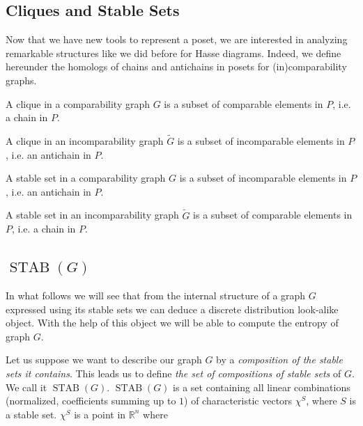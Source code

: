 \subsection{Cliques and Stable Sets}


Now that we have new tools to represent a poset, we are interested in analyzing remarkable structures like we did before for Hasse diagrams. Indeed, we define hereunder the homologs of chains and antichains in posets for (in)comparability graphs.


A clique in a comparability graph ${G}$ is a subset of comparable  elements in ${P}$, i.e. a chain in ${P}$.

A clique in an incomparability graph $\widetilde{G}$ is a subset of incomparable  elements in ${P}$, i.e. an antichain in ${P}$.


A stable set in a comparability graph ${G}$ is a subset of incomparable elements in ${P}$, i.e. an antichain in ${P}$.

A stable set in an incomparability graph $\widetilde{G}$ is a subset of comparable elements in ${P}$, i.e. a chain in ${P}$.





\subsection{$\operatorname{STAB}(G)$}
\label{tree:poset:graph:stab}

In what follows we will see that from the internal structure of a graph $G$ expressed using its stable sets we can deduce a discrete distribution look-alike object. With the help of this object we will be able to compute the entropy of graph $G$.

Let us suppose we want to describe our graph $G$ by a \emph{composition of the stable sets it contains}. This leads us to define \emph{the set of compositions of stable sets} of $G$. We call it $\operatorname{STAB}(G)$. $\operatorname{STAB}(G)$ is a set containing all linear combinations (normalized, coefficients summing up to $1$) of characteristic vectors $\chi^S$, where $S$ is a stable set. $\chi^S$ is a point in $\mathbb{R}^n$ where

